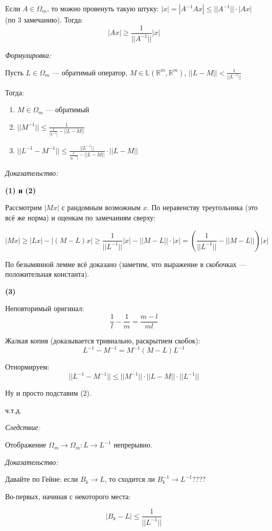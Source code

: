 \documentclass{article}
\begin{document}
Если $A \in \Omega_m$, то можно провенуть такую штуку: $|x| = |A^{-1}Ax| \le ||A^{-1}||\cdot|Ax|$ (по 3 замечанию). Тогда:
\[|Ax|\ge \frac{1}{||A^{-1}||} |x|\]

\textit{Формулировка:}

Пусть $L \in \Omega_m$ --- обратимый оператор, $M \in \mathbb{L}(\mathbb{R}^m, \mathbb{R}^m)$, $||L - M|| < \frac{1}{||L^{-1}||}$

Тогда: \begin{enumerate}
    \item $M \in \Omega_{m}$ --- обратимый
    \item $||M^{-1}|| \le \frac{1}{\frac{1}{|L^{-1}|} - ||L - M||}$
    \item $||L^{-1} - M^{-1}|| \le \frac{||L^{-1}||}{\frac{1}{|L^{-1}|} - ||L - M||} \cdot ||L - M||$
\end{enumerate}

\textit{Доказательство:}

\textbf{(1) и (2)}

Рассмотрим $|Mx|$ с рандомным возможным $x$. По неравенству треугольника (это всё же норма) и оценкам по замечаниям сверху:

\[|Mx| \ge |Lx| - |(M - L)x| \ge \frac{1}{||L^{-1}||}|x| - ||M - L||\cdot|x| = \left(\frac{1}{||L^{-1}||} - ||M - L||\right)|x|\]

По безымянной лемме всё доказано (заметим, что выражение в скобочках --- положительная константа).

\textbf{(3)}

Неповторимый оригинал:
\[\frac{1}{l} - \frac{1}{m} = \frac{m - l}{ml}\]

Жалкая копия (доказывается тривиально, раскрытием скобок):
\[L^{-1}  - M^{-1} = M^{-1}(M - L)L^{-1}\]

Отнормируем:
\[||L^{-1} - M^{-1}|| \le ||M^{-1}|| \cdot ||L - M|| \cdot ||L^{-1}||\]

Ну и просто подставим (2).

ч.т.д.

\textit{Следствие:}

Отображение $\Omega_m \rightarrow \Omega_m: L \rightarrow L^{-1}$ непрерывно.

\textit{Доказательство:}

Давайте по Гейне: если $B_k \rightarrow L$, то сходится ли $B^{-1}_k \rightarrow L^{-1}$????

Во-первых, начиная с некоторого места:

\[|B_k - L| \le \frac{1}{||L^{-1}||}\]
\end{document}
